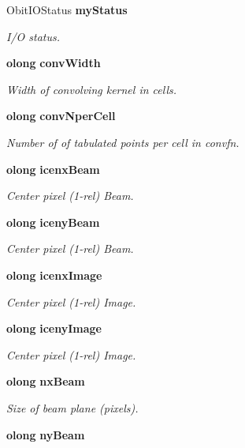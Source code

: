 \begin{CompactItemize}
Obit\-IOStatus {\bf my\-Status}
\begin{CompactList}\small\item\em I/O status. \item\end{CompactList}\item 
{\bf olong} {\bf conv\-Width}
\begin{CompactList}\small\item\em Width of convolving kernel in cells. \item\end{CompactList}\item 
{\bf olong} {\bf conv\-Nper\-Cell}
\begin{CompactList}\small\item\em Number of of tabulated points per cell in convfn. \item\end{CompactList}\item 
{\bf olong} {\bf icenx\-Beam}
\begin{CompactList}\small\item\em Center pixel (1-rel) Beam. \item\end{CompactList}\item 
{\bf olong} {\bf iceny\-Beam}
\begin{CompactList}\small\item\em Center pixel (1-rel) Beam. \item\end{CompactList}\item 
{\bf olong} {\bf icenx\-Image}
\begin{CompactList}\small\item\em Center pixel (1-rel) Image. \item\end{CompactList}\item 
{\bf olong} {\bf iceny\-Image}
\begin{CompactList}\small\item\em Center pixel (1-rel) Image. \item\end{CompactList}\item 
{\bf olong} {\bf nx\-Beam}
\begin{CompactList}\small\item\em Size of beam plane (pixels). \item\end{CompactList}\item 
{\bf olong} {\bf ny\-Beam}

\end{CompactItemize}
